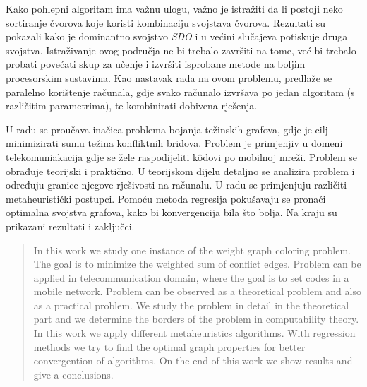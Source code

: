 \documentclass[times, utf8, diplomski, numeric]{fer}
\begin{document}
Kako pohlepni algoritam ima važnu ulogu, važno je istražiti da li postoji neko sortiranje čvorova koje koristi kombinaciju svojstava čvorova. Rezultati su pokazali kako je dominantno svojstvo \emph{SDO} i u većini slučajeva potiskuje druga svojstva. Istraživanje ovog područja ne bi trebalo završiti na tome, već bi trebalo probati povećati skup za učenje i izvršiti isprobane metode na boljim procesorskim sustavima. Kao nastavak rada na ovom problemu, predlaže se paralelno korištenje računala, gdje svako računalo izvršava po jedan algoritam (s različitim parametrima), te kombinirati dobivena rješenja. 




\begin{sazetak}

U radu se proučava inačica problema bojanja težinskih grafova, gdje je cilj minimizirati sumu težina konfliktnih bridova. Problem je primjenjiv u domeni telekomuniakacija gdje se žele raspodijeliti k\^{o}dovi po mobilnoj mreži. Problem se obrađuje teorijski i praktično. U teorijskom dijelu detaljno se analizira problem i određuju granice njegove rješivosti na računalu. U radu se primjenjuju različiti metaheuristički postupci. Pomoću metoda regresija pokušavaju se pronaći optimalna svojstva grafova, kako bi konvergencija bila što bolja. Na kraju su prikazani rezultati i zaključci.

\end{sazetak}

\begin{abstract}

In this work we study one instance of the weight graph coloring problem. The goal is to minimize the weighted sum of conflict edges. Problem can be applied in telecommunication domain, where the goal is to set codes in a mobile network. Problem can be observed as a theoretical problem and also as a practical problem. We study the problem in detail in the theoretical part and we determine the borders of the problem in computability theory. In this work we apply different metaheuristics algorithms. With regression methods we try to find the optimal graph properties for better convergention of algorithms. On the end of this work we show results and give a conclusions.


\end{abstract}
\end{document}
